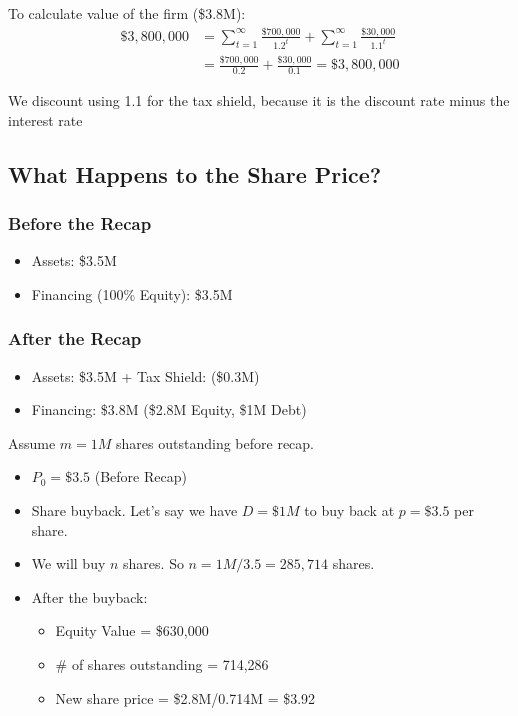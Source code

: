 To calculate value of the firm (\$3.8M):
\begin{align*}
 \$ 3,800,000 &= \sum^{\infty}_{t=1} {\frac{\$700,000}{1.2^t}} + \sum^{\infty}_{t=1} {\frac{\$30,000}{1.1^t}}\\
   &= \frac{\$700,000}{0.2} + \frac{\$30,000}{0.1} = \$3,800,000
\end{align*}

We discount using 1.1 for the tax shield, because it is the discount rate minus the interest rate

\subsection*{What Happens to the Share Price?}

\subsubsection*{Before the Recap}
\begin{itemize}
    \item Assets: \$3.5M
    \item Financing (100\% Equity): \$3.5M
\end{itemize}

\subsubsection*{After the Recap}
\begin{itemize}
    \item Assets: \$3.5M + Tax Shield: (\$0.3M)  
    \item Financing: \$3.8M (\$2.8M Equity, \$1M Debt)
\end{itemize}

Assume $m=1M$ shares outstanding before recap.

\begin{itemize}
    \item $P_0 = \$3.5$ (Before Recap)
    \item Share buyback. Let's say we have $D=\$1M$ to buy back at $p=\$3.5$ per share. 
    \item We will buy $n$ shares. So $n = 1M/3.5 = 285,714$ shares.
    \item After the buyback:
    \begin{itemize}
        \item Equity Value = \$630,000
        \item \# of shares outstanding = 714,286
        \item New share price = \$2.8M/0.714M = \$3.92
    \end{itemize}
\end{itemize}

